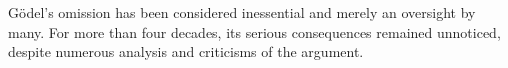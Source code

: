 \documentclass{llncs}
\newcommand{\logic}[1]{\textbf{#1}\xspace}
\newcommand{\K}{\logic{K}}
\begin{document}
G\"odel's omission has been
considered inessential and merely an oversight by many. 
For more than four decades, its serious consequences remained unnoticed, 
despite numerous analysis and criticisms of the
argument.%
\end{document}
